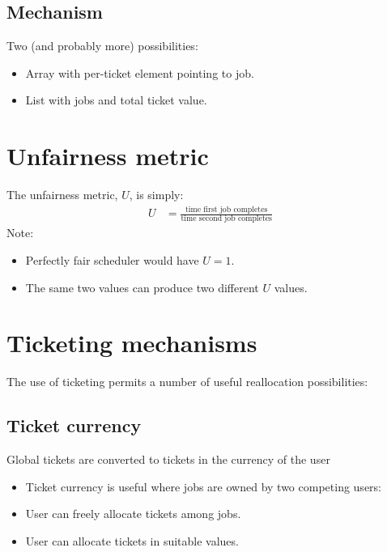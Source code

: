 \subsection{Mechanism}

Two (and probably more) possibilities: 

\begin{itemize}
\item Array with per-ticket element pointing to job.
\item List with jobs and total ticket value.
\end{itemize}

\section{Unfairness metric}

The unfairness metric, $U$, is simply:
\begin{align}
  U & = \frac{\mbox{time first job completes}}{\mbox{time second job completes}} \label{eq:unfairness-metric}
\end{align}
Note:
\begin{itemize}
\item Perfectly fair scheduler would have $U=1$.
\item The same two values can produce two different $U$ values.
\end{itemize}

\section{Ticketing mechanisms}

The use of ticketing permits a number of useful reallocation possibilities:

\subsection{Ticket currency}

Global tickets are converted to tickets in the currency of the user

\begin{itemize}
\item Ticket currency is useful where jobs are owned by two competing users:
\item User can freely allocate tickets among jobs.
\item User can allocate tickets in suitable values.
\end{itemize}

